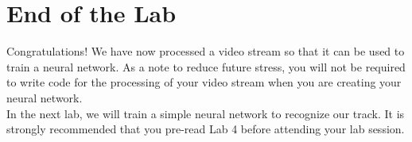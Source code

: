 \documentclass[11pt]{report}
\begin{document}
\chapter{End of the Lab}
Congratulations! We have now processed a video stream so that it can be used to train a neural network. As a note to reduce future stress, you will not be required to write code for the processing of your video stream when you are creating your neural network. 
\\
In the next lab, we will train a simple neural network to recognize our track. It is strongly recommended that you pre-read Lab 4 before attending your lab session.
\end{document}
